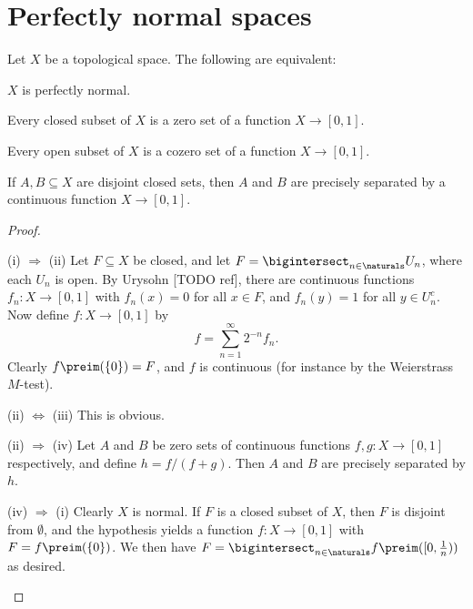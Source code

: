 \documentclass[article, a4paper, 11pt, oneside]{memoir}
\numberwithin{equation}{chapter}
\renewcommand{\implies}{\Rightarrow}
\renewcommand{\iff}{\Leftrightarrow}
\begin{document}
\chapter{Perfectly normal spaces}


\begin{theorem}
    Let $X$ be a topological space. The following are equivalent:
    \begin{enumthm}
        \item $X$ is perfectly normal.
        \item Every closed subset of $X$ is a zero set of a function $X \to [0,1]$.
        \item Every open subset of $X$ is a cozero set of a function $X \to [0,1]$.
        \item If $A,B \subseteq X$ are disjoint closed sets, then $A$ and $B$ are precisely separated by a continuous function $X \to [0,1]$.
    \end{enumthm}
\end{theorem}

\begin{proof}    
\begin{proofsec}
    \item[(i) $\implies$ (ii)] 
    Let $F \subseteq X$ be closed, and let $F = \bigintersect_{n \in \naturals} U_n$, where each $U_n$ is open. By Urysohn [TODO ref], there are continuous functions $f_n \colon X \to [0,1]$ with $f_n(x) = 0$ for all $x \in F$, and $f_n(y) = 1$ for all $y \in U_n^c$. Now define $f \colon X \to [0,1]$ by
    \begin{equation*}
        f
            = \sum_{n = 1}^\infty 2^{-n} f_n.
    \end{equation*}
    Clearly $f\preim(\{0\}) = F$, and $f$ is continuous (for instance by the Weierstrass $M$-test).

    \item[(ii) $\iff$ (iii)]
    This is obvious.

    \item[(ii) $\implies$ (iv)]
    Let $A$ and $B$ be zero sets of continuous functions $f,g \colon X \to [0,1]$ respectively, and define $h = f/(f+g)$. Then $A$ and $B$ are precisely separated by $h$.

    \item[(iv) $\implies$ (i)]
    Clearly $X$ is normal. If $F$ is a closed subset of $X$, then $F$ is disjoint from $\emptyset$, and the hypothesis yields a function $f \colon X \to [0,1]$ with $F = f\preim(\{0\})$. We then have $F = \bigintersect_{n \in \naturals} f\preim([0,\tfrac{1}{n}))$ as desired.
\end{proofsec}
\end{proof}
\end{document}
